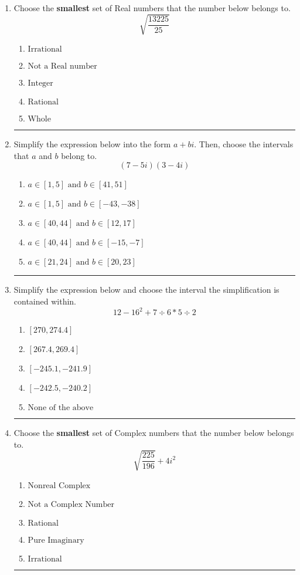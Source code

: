 \documentclass[14pt]{extbook}
\newcommand{\litem}[1]{\item#1\hspace*{-1cm}\rule{\textwidth}{0.4pt}}
\begin{document}
\begin{enumerate}
\litem{
Choose the \textbf{smallest} set of Real numbers that the number below belongs to.\[ \sqrt{\frac{13225}{25}} \]\begin{enumerate}[label=\Alph*.]
\item \( \text{Irrational} \)
\item \( \text{Not a Real number} \)
\item \( \text{Integer} \)
\item \( \text{Rational} \)
\item \( \text{Whole} \)

\end{enumerate} }
\litem{
Simplify the expression below into the form $a+bi$. Then, choose the intervals that $a$ and $b$ belong to.\[ (7 - 5 i)(3 - 4 i) \]\begin{enumerate}[label=\Alph*.]
\item \( a \in [1, 5] \text{ and } b \in [41, 51] \)
\item \( a \in [1, 5] \text{ and } b \in [-43, -38] \)
\item \( a \in [40, 44] \text{ and } b \in [12, 17] \)
\item \( a \in [40, 44] \text{ and } b \in [-15, -7] \)
\item \( a \in [21, 24] \text{ and } b \in [20, 23] \)

\end{enumerate} }
\litem{
Simplify the expression below and choose the interval the simplification is contained within.\[ 12 - 16^2 + 7 \div 6 * 5 \div 2 \]\begin{enumerate}[label=\Alph*.]
\item \( [270, 274.4] \)
\item \( [267.4, 269.4] \)
\item \( [-245.1, -241.9] \)
\item \( [-242.5, -240.2] \)
\item \( \text{None of the above} \)

\end{enumerate} }
\litem{
Choose the \textbf{smallest} set of Complex numbers that the number below belongs to.\[ \sqrt{\frac{225}{196}} + 4i^2 \]\begin{enumerate}[label=\Alph*.]
\item \( \text{Nonreal Complex} \)
\item \( \text{Not a Complex Number} \)
\item \( \text{Rational} \)
\item \( \text{Pure Imaginary} \)
\item \( \text{Irrational} \)


\end{enumerate}}
\end{enumerate}
\end{document}
